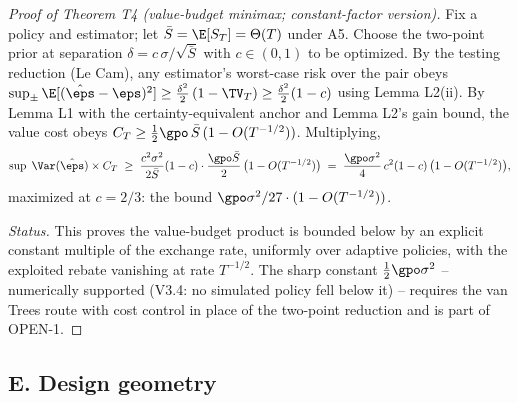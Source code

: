 \documentclass[11pt]{article}
\begin{document}
\begin{proof}[Proof of Theorem T4 (value-budget minimax; constant-factor
version)]
Fix a policy and estimator; let $\bar S = \E[S_T] = \Theta(T)$ under A5.
Choose the two-point prior at separation $\delta = c\,\sigma/\sqrt{\bar S}$
with $c \in (0,1)$ to be optimized. By the testing reduction (Le Cam), any
estimator's worst-case risk over the pair obeys
$\sup_{\pm} \E[(\hat\eps - \eps)^2] \ge \tfrac{\delta^2}{2}\,(1 - \TV_T)
\ge \tfrac{\delta^2}{2}(1 - c)$ using Lemma L2(ii). By Lemma L1 with the
certainty-equivalent anchor and Lemma L2's gain bound, the value cost obeys
$C_T \ge \tfrac{1}{2}\gpo\,\bar S\,(1 - O(T^{-1/2}))$. Multiplying,
\[
\sup\; \Var(\hat\eps)\times C_T
 \;\ge\; \frac{c^2\sigma^2}{2\bar S}(1-c)\cdot
 \frac{\gpo \bar S}{2}\,\big(1 - O(T^{-1/2})\big)
 \;=\; \frac{\gpo\sigma^2}{4}\,c^2(1-c)\,\big(1 - O(T^{-1/2})\big),
\]
maximized at $c = 2/3$: the bound $\gpo\sigma^2/27 \cdot (1 - O(T^{-1/2}))$.

\emph{Status.} This proves the value-budget product is bounded below by an
explicit constant multiple of the exchange rate, uniformly over adaptive
policies, with the exploited rebate vanishing at rate $T^{-1/2}$. The
sharp constant $\tfrac{1}{2}\gpo\sigma^2$ -- numerically supported (V3.4:
no simulated policy fell below it) -- requires the van Trees route with
cost control in place of the two-point reduction and is part of OPEN-1.
\end{proof}

\subsection*{E. Design geometry}
\end{document}
